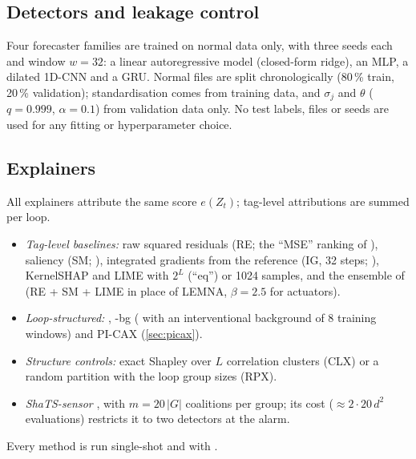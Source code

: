 \subsection{Detectors and leakage control}
Four forecaster families are trained on normal data only, with three seeds each and window $w=32$: a linear autoregressive model (closed-form ridge), an MLP, a dilated 1D-CNN \citep[cf.][]{kravchik2018cnn} and a GRU. Normal files are split chronologically (80\,\% train, 20\,\% validation); standardisation comes from training data, and $\sigma_j$ and $\theta$ ($q=0.999$, $\alpha=0.1$) from validation data only. No test labels, files or seeds are used for any fitting or hyperparameter choice.

\subsection{Explainers}
All explainers attribute the same score $e(Z_t)$; tag-level attributions are summed per loop.
\begin{itemize}
\item \emph{Tag-level baselines:} raw squared residuals (RE; the ``MSE'' ranking of \citealp{fung2024attributions}), saliency (SM; \citealp{simonyan2014saliency}), integrated gradients from the reference (IG, 32 steps; \citealp{sundararajan2017ig}), KernelSHAP \citep{lundberg2017shap} and LIME \citep{ribeiro2016lime} with $2^L$ (``eq'') or 1024 samples, and the ensemble of \citet{fung2024attributions} (RE + SM + LIME in place of LEMNA, $\beta=2.5$ for actuators).
\item \emph{Loop-structured:} \LX, \LX-bg (\LX{} with an interventional background of 8 training windows) and PI-CAX (\cref{sec:picax}).
\item \emph{Structure controls:} exact Shapley over $L$ correlation clusters (CLX) or a random partition with the loop group sizes (RPX).
\item \emph{ShaTS-sensor} \citep{franco2026shats}, with $m=20\,|G|$ coalitions per group; its cost ($\approx2\cdot20\,d^2$ evaluations) restricts it to two detectors at the alarm.
\end{itemize}
Every method is run single-shot and with \TEA.

